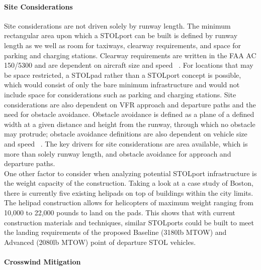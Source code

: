 \documentclass[]{aiaa-tc}%
\begin{document}
\paragraph{Site Considerations}
Site considerations are not driven solely by runway length. The minimum rectangular area upon which a STOLport can be built is defined by runway length as we well as room for taxiways, clearway requirements, and space for parking and charging stations. Clearway requirements are written in the FAA AC 150/5300 and are dependent on aircraft size and speed ~\cite{AC150}. For locations that may be space restricted, a STOLpad rather than a STOLport concept is possible, which would consist of only the bare minimum infrastructure and would not include space for considerations such as parking and charging stations. Site considerations are also dependent on VFR approach and departure paths and the need for obstacle avoidance. Obstacle avoidance is defined as a plane of a defined width at a given distance and height from the runway, through which no obstacle may protrude; obstacle avoidance definitions are also dependent on vehicle size and speed ~\cite{AC150}. The key drivers for site considerations are area available, which is more than solely runway length, and obstacle avoidance for approach and departure paths.\\
One other factor to consider when analyzing potential STOLport infrastructure is the weight capacity of the construction. Taking a look at a case study of Boston, there is currently five existing helipads on top of buildings within the city limits. The helipad construction allows for helicopters of maximum weight ranging from 10,000 to 22,000 pounds to land on the pads. This shows that with current construction materials and techniques, similar STOLports could be built to meet the landing requirements of the proposed Baseline (3180lb MTOW) and Advanced (2080lb MTOW) point of departure STOL vehicles.

\paragraph{Crosswind Mitigation}
\end{document}
